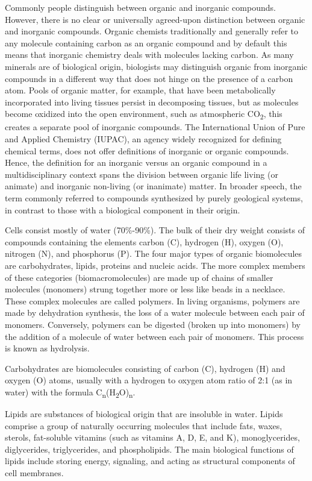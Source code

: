 \documentclass[]{book}
\theoremstyle{definition}
\theoremstyle{definition}
\theoremstyle{definition}
\theoremstyle{remark}
\begin{document}
Commonly people distinguish between organic and inorganic compounds.
However, there is no clear or universally agreed-upon distinction
between organic and inorganic compounds. Organic chemists traditionally
and generally refer to any molecule containing carbon as an organic
compound and by default this means that inorganic chemistry deals with
molecules lacking carbon. As many minerals are of biological origin,
biologists may distinguish organic from inorganic compounds in a
different way that does not hinge on the presence of a carbon atom.
Pools of organic matter, for example, that have been metabolically
incorporated into living tissues persist in decomposing tissues, but as
molecules become oxidized into the open environment, such as atmospheric
CO\textsubscript{2}, this creates a separate pool of inorganic
compounds. The International Union of Pure and Applied Chemistry
(IUPAC), an agency widely recognized for defining chemical terms, does
not offer definitions of inorganic or organic compounds. Hence, the
definition for an inorganic versus an organic compound in a
multidisciplinary context spans the division between organic life living
(or animate) and inorganic non-living (or inanimate) matter. In broader
speech, the term commonly referred to compounds synthesized by purely
geological systems, in contrast to those with a biological component in
their origin.

Cells consist mostly of water (70\%-90\%). The bulk of their dry weight
consists of compounds containing the elements carbon (C), hydrogen (H),
oxygen (O), nitrogen (N), and phosphorus (P). The four major types of
organic biomolecules are carbohydrates, lipids, proteins and nucleic
acids. The more complex members of these categories (biomacromolecules)
are made up of chains of smaller molecules (monomers) strung together
more or less like beads in a necklace. These complex molecules are
called polymers. In living organisms, polymers are made by dehydration
synthesis, the loss of a water molecule between each pair of monomers.
Conversely, polymers can be digested (broken up into monomers) by the
addition of a molecule of water between each pair of monomers. This
process is known as hydrolysis.

Carbohydrates are biomolecules consisting of carbon (C), hydrogen (H)
and oxygen (O) atoms, usually with a hydrogen to oxygen atom ratio of
2:1 (as in water) with the formula
C\textsubscript{n}(H\textsubscript{2}O)\textsubscript{n}.

Lipids are substances of biological origin that are insoluble in water.
Lipids comprise a group of naturally occurring molecules that include
fats, waxes, sterols, fat-soluble vitamins (such as vitamins A, D, E,
and K), monoglycerides, diglycerides, triglycerides, and phospholipids.
The main biological functions of lipids include storing energy,
signaling, and acting as structural components of cell membranes.
\end{document}
